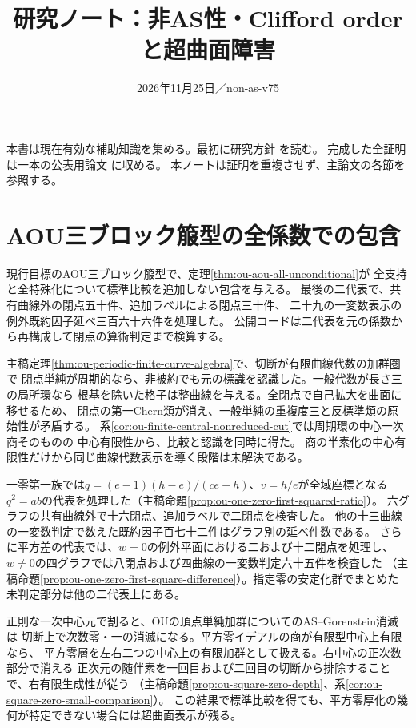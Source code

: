 \documentclass[11pt,a4paper]{ltjsarticle}
\title{研究ノート：非AS性・Clifford orderと超曲面障害}
\author{}
\date{2026年11月25日／non-as-v75}
\begin{document}
\maketitle
本書は現在有効な補助知識を集める。最初に研究方針  を読む。
完成した全証明は一本の公表用論文  に収める。
本ノートは証明を重複させず、主論文の各節を参照する。

\section{AOU三ブロック箙型の全係数での包含}
\label{sec:ou-converse-notes}

現行目標のAOU三ブロック箙型で、定理\ref{thm:ou-aou-all-unconditional}が
全支持と全特殊化について標準比較を追加しない包含を与える。
最後の二代表で、共有曲線外の閉点五十件、追加ラベルによる閉点三十件、
二十九の一変数表示の例外既約因子延べ三百六十六件を処理した。
公開コードは二代表を元の係数から再構成して閉点の算術判定まで検算する。

主稿定理\ref{thm:ou-periodic-finite-curve-algebra}で、切断が有限曲線代数の加群圏で
閉点単純が周期的なら、非被約でも元の標識を認識した。一般代数が長さ三の局所環なら
根基を除いた格子は整曲線を与える。全閉点で自己拡大を曲面に移せるため、
閉点の第一Chern類が消え、一般単純の重複度三と反標準類の原始性が矛盾する。
系\ref{cor:ou-finite-central-nonreduced-cut}では周期環の中心一次商そのものの
中心有限性から、比較と認識を同時に得た。
商の半素化の中心有限性だけから同じ曲線代数表示を導く段階は未解決である。

一零第一族では$q=(e-1)(h-e)/(ce-h)$、$v=h/e$が全域座標となる
$q^2=ab$の代表を処理した（主稿命題\ref{prop:ou-one-zero-first-squared-ratio}）。
六グラフの共有曲線外で十六閉点、追加ラベルで二閉点を検査した。
他の十三曲線の一変数判定で数えた既約因子百七十二件はグラフ別の延べ件数である。
さらに平方差の代表では、$w=0$の例外平面における二および十二閉点を処理し、
$w\ne0$の四グラフでは八閉点および四曲線の一変数判定六十五件を検査した
（主稿命題\ref{prop:ou-one-zero-first-square-difference}）。指定零の安定化群でまとめた未判定部分は他の二代表上にある。

正則な一次中心元で割ると、OUの頂点単純加群についてのAS--Gorenstein消滅は
切断上で次数零・一の消滅になる。平方零イデアルの商が有限型中心上有限なら、
平方零層を左右二つの中心上の有限加群として扱える。右中心の正次数部分で消える
正次元の随伴素を一回目および二回目の切断から排除することで、右有限生成性が従う
（主稿命題\ref{prop:ou-square-zero-depth}、系\ref{cor:ou-square-zero-small-comparison}）。
この結果で標準比較を得ても、平方零厚化の幾何が特定できない場合には超曲面表示が残る。
\end{document}
